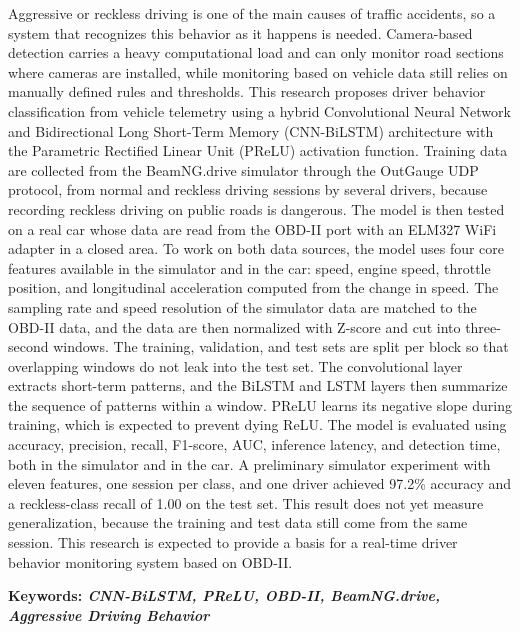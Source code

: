 Aggressive or reckless driving is one of the main causes of traffic accidents, so a system that recognizes this behavior as it happens is needed. Camera-based detection carries a heavy computational load and can only monitor road sections where cameras are installed, while monitoring based on vehicle data still relies on manually defined rules and thresholds. This research proposes driver behavior classification from vehicle telemetry using a hybrid Convolutional Neural Network and Bidirectional Long Short-Term Memory (CNN-BiLSTM) architecture with the Parametric Rectified Linear Unit (PReLU) activation function. Training data are collected from the BeamNG.drive simulator through the OutGauge UDP protocol, from normal and reckless driving sessions by several drivers, because recording reckless driving on public roads is dangerous. The model is then tested on a real car whose data are read from the OBD-II port with an ELM327 WiFi adapter in a closed area. To work on both data sources, the model uses four core features available in the simulator and in the car: speed, engine speed, throttle position, and longitudinal acceleration computed from the change in speed. The sampling rate and speed resolution of the simulator data are matched to the OBD-II data, and the data are then normalized with Z-score and cut into three-second windows. The training, validation, and test sets are split per block so that overlapping windows do not leak into the test set. The convolutional layer extracts short-term patterns, and the BiLSTM and LSTM layers then summarize the sequence of patterns within a window. PReLU learns its negative slope during training, which is expected to prevent dying ReLU. The model is evaluated using accuracy, precision, recall, F1-score, AUC, inference latency, and detection time, both in the simulator and in the car. A preliminary simulator experiment with eleven features, one session per class, and one driver achieved 97.2\% accuracy and a reckless-class recall of 1.00 on the test set. This result does not yet measure generalization, because the training and test data still come from the same session. This research is expected to provide a basis for a real-time driver behavior monitoring system based on OBD-II.

\vspace{2ex}
\noindent
\textbf{Keywords: \emph{CNN-BiLSTM, PReLU, OBD-II, BeamNG.drive, Aggressive Driving Behavior}}
